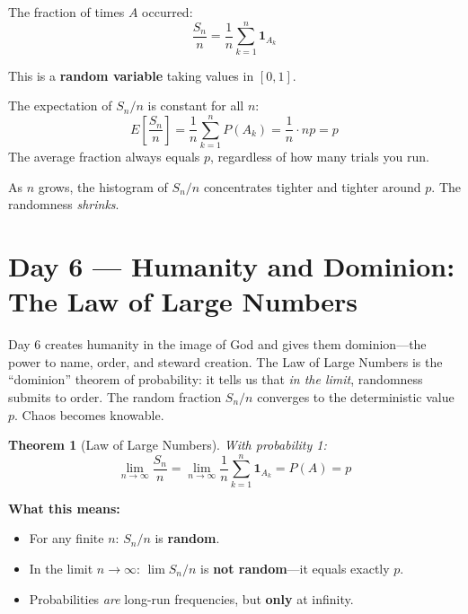\documentclass[11pt]{article}
\newtheorem{theorem}{Theorem}
\begin{document}
The fraction of times $A$ occurred:
\[
\frac{S_n}{n} = \frac{1}{n} \sum_{k=1}^{n} \mathbf{1}_{A_k}
\]

This is a \textbf{random variable} taking values in $[0, 1]$.

\begin{conceptbox}
The expectation of $S_n/n$ is constant for all $n$:
\[
E\!\left[\frac{S_n}{n}\right] = \frac{1}{n} \sum_{k=1}^{n} P(A_k) = \frac{1}{n} \cdot np = p
\]
The average fraction always equals $p$, regardless of how many trials you run.
\end{conceptbox}

As $n$ grows, the histogram of $S_n/n$ concentrates tighter and tighter around $p$. The randomness \emph{shrinks}.

\section{Day 6 --- Humanity and Dominion: The Law of Large Numbers}

\begin{creationbox}
Day 6 creates humanity in the image of God and gives them dominion---the power to name, order, and steward creation. The Law of Large Numbers is the ``dominion'' theorem of probability: it tells us that \emph{in the limit}, randomness submits to order. The random fraction $S_n/n$ converges to the deterministic value $p$. Chaos becomes knowable.
\end{creationbox}

\begin{theorem}[Law of Large Numbers]
With probability 1:
\[
\boxed{\lim_{n \to \infty} \frac{S_n}{n} = \lim_{n \to \infty} \frac{1}{n} \sum_{k=1}^{n} \mathbf{1}_{A_k} = P(A) = p}
\]
\end{theorem}

\textbf{What this means:}
\begin{itemize}[nosep]
  \item For any finite $n$: $S_n/n$ is \textbf{random}.
  \item In the limit $n \to \infty$: $\lim S_n/n$ is \textbf{not random}---it equals exactly $p$.
  \item Probabilities \emph{are} long-run frequencies, but \textbf{only} at infinity.
\end{itemize}
\end{document}
